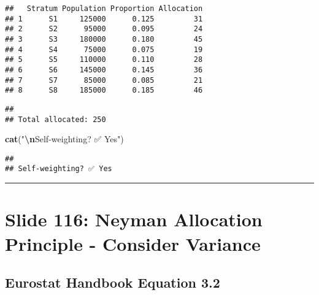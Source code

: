 \documentclass[
]{article}
\newenvironment{Shaded}{\begin{snugshade}}{\end{snugshade}}
\newcommand{\FunctionTok}[1]{\textcolor[rgb]{0.13,0.29,0.53}{\textbf{#1}}}
\newcommand{\NormalTok}[1]{#1}
\newcommand{\SpecialCharTok}[1]{\textcolor[rgb]{0.81,0.36,0.00}{\textbf{#1}}}
\newcommand{\StringTok}[1]{\textcolor[rgb]{0.31,0.60,0.02}{#1}}
\begin{document}
\begin{verbatim}
##   Stratum Population Proportion Allocation
## 1      S1     125000      0.125         31
## 2      S2      95000      0.095         24
## 3      S3     180000      0.180         45
## 4      S4      75000      0.075         19
## 5      S5     110000      0.110         28
## 6      S6     145000      0.145         36
## 7      S7      85000      0.085         21
## 8      S8     185000      0.185         46
\end{verbatim}

\begin{Shaded}
\end{Shaded}

\begin{verbatim}
## 
## Total allocated: 250
\end{verbatim}

\begin{Shaded}
\begin{Highlighting}[]
\FunctionTok{cat}\NormalTok{(}\StringTok{"}\SpecialCharTok{\textbackslash{}n}\StringTok{Self{-}weighting? ✅ Yes"}\NormalTok{)}
\end{Highlighting}
\end{Shaded}

\begin{verbatim}
## 
## Self-weighting? ✅ Yes
\end{verbatim}

\begin{center}\rule{0.5\linewidth}{0.5pt}\end{center}

\section{Slide 116: Neyman Allocation Principle - Consider
Variance}\label{slide-116-neyman-allocation-principle---consider-variance}

\subsection{Eurostat Handbook Equation
3.2}\label{eurostat-handbook-equation-3.2}
\end{document}
